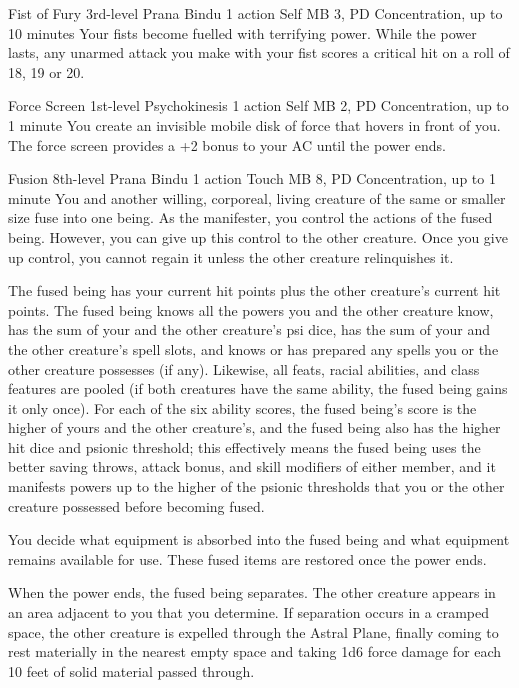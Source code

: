 \DndPowerHeader%
  {Fist of Fury}
  {3rd-level Prana Bindu}
  {1 action}
  {Self}
  {MB 3, PD \lvlthree}
  {Concentration, up to 10 minutes}
Your fists become fuelled with terrifying power.
While the power lasts,
any unarmed attack you make with your fist
scores a critical hit on a roll of
18, 19 or 20.

\DndPowerHeader%
  {Force Screen}
  {1st-level Psychokinesis}
  {1 action}
  {Self}
  {MB 2, PD \lvlone}
  {Concentration, up to 1 minute}
You create an invisible mobile disk of force that hovers in front of you.
The force screen provides a +2 bonus to your AC until the power ends.

\DndPowerHeader%
  {Fusion}
  {8th-level Prana Bindu}
  {1 action}
  {Touch}
  {MB 8, PD \lvleight}
  {Concentration, up to 1 minute}
You and another willing, corporeal, living creature
of the same or smaller size fuse into one being.
As the manifester,
you control the actions of the fused being.
However, you can give up this control to the other creature.
Once you give up control,
you cannot regain it unless the other creature relinquishes it.

The fused being has your current hit points
plus the other creature's current hit points.
The fused being knows all the powers you
and the other creature know,
has the sum of your and the other creature's psi dice,
has the sum of your and the other creature's spell slots,
and knows or has prepared any spells you or the other creature possesses
(if any).
Likewise, all feats, racial abilities, and class features
are pooled
(if both creatures have the same ability,
the fused being gains it only once).
For each of the six ability scores,
the fused being's score is the higher of yours
and the other creature's,
and the fused being also has the higher hit dice
and psionic threshold;
this effectively means the fused being uses
the better saving throws,
attack bonus,
and skill modifiers of either member,
and it manifests powers up to the higher of the psionic thresholds
that you or the other creature possessed before becoming fused.

You decide what equipment is absorbed into the fused being
and what equipment remains available for use.
These fused items are restored once the power ends.

When the power ends,
the fused being separates.
The other creature appears in an area adjacent to you that you determine.
If separation occurs in a cramped space,
the other creature is expelled through the Astral Plane,
finally coming to rest materially in the nearest empty space
and taking 1d6 force damage
for each 10 feet of solid material passed through.

